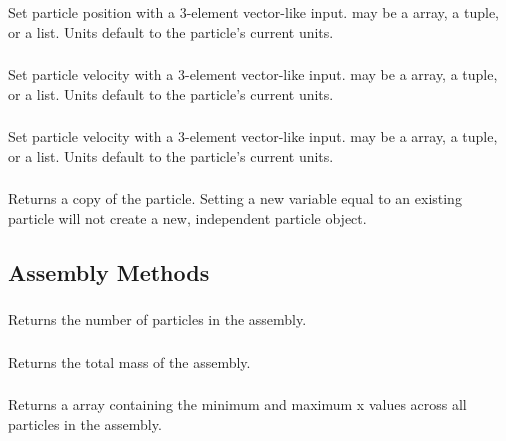 \subsubsection{}
Set particle position with a 3-element vector-like input.  may be a  array, a tuple, or a list. Units default to the particle's current units.

\subsubsection{}
Set particle velocity with a 3-element vector-like input.  may be a  array, a tuple, or a list. Units default to the particle's current units.

\subsubsection{}
Set particle velocity with a 3-element vector-like input.  may be a  array, a tuple, or a list. Units default to the particle's current units.

\subsubsection{}
Returns a copy of the particle. Setting a new variable equal to an existing particle will not create a new, independent particle object.




 
\subsection{Assembly Methods}


\subsubsection{}
Returns the number of particles in the assembly.

\subsubsection{}
Returns the total mass of the assembly.

\subsubsection{}
Returns a  array containing the minimum and maximum x values across all particles in the assembly.

